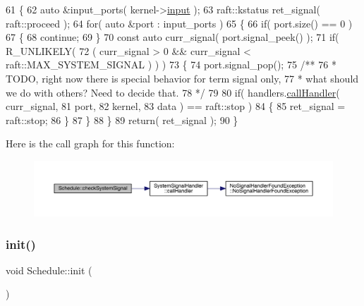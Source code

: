 \begin{DoxyCode}
61 \{
62    \textcolor{keyword}{auto} &input\_ports( kernel->\hyperlink{classraft_1_1kernel_a6edbe35a56409d402e719b3ac36d6554}{input} );
63    raft::kstatus ret\_signal( raft::proceed );
64    \textcolor{keywordflow}{for}( \textcolor{keyword}{auto} &port : input\_ports )
65    \{
66       \textcolor{keywordflow}{if}( port.size() == 0 )
67       \{
68          \textcolor{keywordflow}{continue};
69       \}
70       \textcolor{keyword}{const} \textcolor{keyword}{auto} curr\_signal( port.signal\_peek() );
71       \textcolor{keywordflow}{if}( R\_UNLIKELY(
72          ( curr\_signal > 0 && curr\_signal < raft::MAX\_SYSTEM\_SIGNAL ) ) )
73       \{
74          port.signal\_pop();\textcolor{comment}{}
75 \textcolor{comment}{         /**}
76 \textcolor{comment}{          * TODO, right now there is special behavior for term signal only,}
77 \textcolor{comment}{          * what should we do with others?  Need to decide that.}
78 \textcolor{comment}{          */}
79 
80          \textcolor{keywordflow}{if}( handlers.\hyperlink{class_system_signal_handler_ac66db8af116e4f887706e58acb0781bb}{callHandler}( curr\_signal,
81                                port,
82                                kernel,
83                                data ) == raft::stop )
84          \{
85             ret\_signal = raft::stop;
86          \}
87       \}
88    \}
89    \textcolor{keywordflow}{return}( ret\_signal );
90 \}
\end{DoxyCode}
Here is the call graph for this function\+:
\nopagebreak
\begin{figure}[H]
\begin{center}
\leavevmode
\includegraphics[width=350pt]{class_schedule_a85de3d48407aa378ccc86a4a4206b32a_cgraph}
\end{center}
\end{figure}
\hypertarget{class_schedule_a5180032a0c2135507859ccf2a4eea1ab}{}\label{class_schedule_a5180032a0c2135507859ccf2a4eea1ab} 
\subsubsection{\texorpdfstring{init()}{init()}}
{\footnotesize\ttfamily void Schedule\+::init (\begin{DoxyParamCaption}{ }\end{DoxyParamCaption})\hspace{0.3cm}{\ttfamily [virtual]}}

